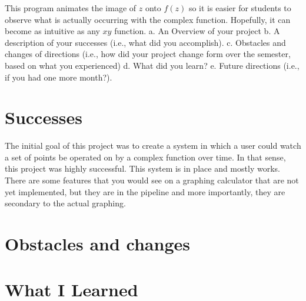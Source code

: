 \documentclass{article}
\begin{document}
    This program animates the image of $z$ onto $f(z)$ so it is easier for students to observe what is actually occurring with the complex function. Hopefully, it can become as intuitive as any $xy$ function.
    a.  An Overview of your project
    b.  A description of your successes (i.e., what did you accomplish).
    c.  Obstacles and changes of directions (i.e., how did your project change form over the semester, based on what you experienced)
    d.  What did you learn?  
    e.  Future directions (i.e., if you had one more month?).
\section{Successes}
    The initial goal of this project was to create a system in which a user could watch a set of points be operated on by a complex function over time. In that sense, this project was highly successful. This system is in place and mostly works. There are some features that you would see on a graphing calculator that are not yet implemented, but they are in the pipeline and more importantly, they are secondary to the actual graphing.
\section{Obstacles and changes}
\section{What I Learned}
\end{document}
